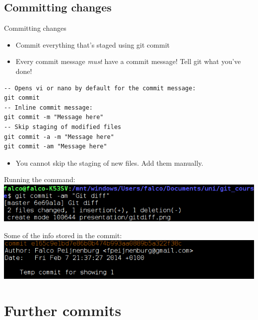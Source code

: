 \documentclass[10pt,a4paper]{beamer}
\begin{document}
\subsection{Committing changes}
\begin{frame}[fragile]{Committing changes}
\begin{itemize}
\item Commit everything that's staged using git commit
\item Every commit message \textit{must} have a commit message! Tell git what you've done!
\end{itemize}
\begin{verbatim}
-- Opens vi or nano by default for the commit message:
git commit
-- Inline commit message:
git commit -m "Message here"
-- Skip staging of modified files
git commit -a -m "Message here"
git commit -am "Message here"
\end{verbatim}
\begin{itemize}
\item You cannot skip the staging of new files. Add them manually.
\end{itemize}
\end{frame}

\begin{frame}
Running the command:
\includegraphics[width=\linewidth]{gitcommitdone.png}

Some of the info stored in the commit:
\includegraphics[width=\linewidth]{gitlogcommit.png}
\end{frame}

\section{Further commits}
\end{document}
